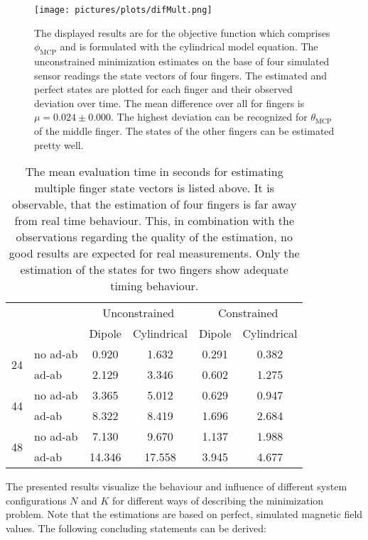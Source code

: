 \begin{figure}[!htb]
\centering
\texttt{[image: pictures/plots/difMult.png]}
\caption[Estimated states of four sensors and four magnets]
{The displayed results are for the objective function which comprises $ \phi_{\mathrm{MCP}} $ and is formulated with the cylindrical model equation. The unconstrained minimization estimates on the base of four simulated sensor readings the state vectors of four fingers. The estimated and perfect states are plotted for each finger and their observed deviation over time. The mean difference over all for fingers is $ \mu = 0.024 \pm 0.000 $. The highest deviation can be recognized for $ \theta_{\mathrm{MCP}} $ of the middle finger. The states of the other fingers can be estimated pretty well.}
\label{fig:difMult}
\end{figure}
\begin{table}[!htb]
\centering
\begin{tabular}{l l c c c c}
\toprule
 & &         			\multicolumn{2}{c}{Unconstrained}		 & 	\multicolumn{2}{c}{Constrained}\\ \cmidrule(lr){3-4} \cmidrule(lr){5-6}
 & & 								Dipole & Cylindrical & Dipole & Cylindrical \\ \midrule[2pt]
\multirow{2}{*}{24} & no ad-ab    & 0.920 & 1.632 & 0.291 & 0.382 \\ 
					& ad-ab		 & 2.129  & 3.346 & 0.602 & 1.275 \\ \midrule
\multirow{2}{*}{44} & no ad-ab   & 3.365 & 5.012 & 0.629 & 0.947 \\ 
					& ad-ab		  & 8.322  & 8.419 & 1.696 & 2.684 \\ \midrule
\multirow{2}{*}{48} & no ad-ab    & 7.130 &  9.670 & 1.137 & 1.988 \\ 
					& ad-ab		 & 14.346 & 17.558 & 3.945 & 4.677 \\										
\bottomrule
\end{tabular}
\caption[Time for one estimation step of multiple finger state vectors]
{The mean evaluation time in seconds for estimating multiple finger state vectors is listed above. It is observable, that the estimation of four fingers is far away from real time behaviour. This, in combination with the observations regarding the quality of the estimation, no good results are expected for real measurements. Only the estimation of the states for two fingers show adequate timing behaviour.}
\label{tab:timeMultFing}
\end{table}
\FloatBarrier
The presented results visualize the behaviour and influence of different system configurations $ N $ and $ K $ for different ways of describing the minimization problem. Note that the estimations are based on perfect, simulated magnetic field values. The following concluding statements can be derived:
